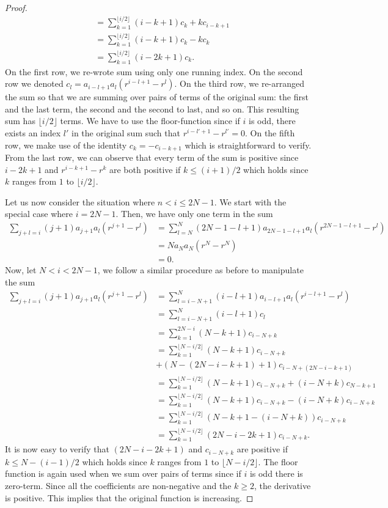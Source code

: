 \begin{proof}
\begin{align*}
&=  \sum_{k =1}^{\lfloor i / 2 \rfloor}(i-k+1)c_k + kc_{i-k+1} \\
&=  \sum_{k =1}^{\lfloor i / 2 \rfloor}(i-k+1)c_k - kc_{k} \\
&= \sum_{k =1}^{\lfloor i / 2 \rfloor}(i-2k+1)c_k.
\end{align*} On the first row, we re-wrote sum using only one running index. On the second row we denoted $c_l =a_{i-l+1}a_l  (r^{i-l+1}- r^l)$. On the third row, we re-arranged the sum so that we are summing over pairs of terms of the original sum: the first and the last term, the second and the second to last, and so on.  This resulting sum has $\lfloor i / 2 \rfloor$ terms. We have to use the floor-function since if $i$ is odd, there exists an index $l'$ in the original sum such that $r^{i-l'+1}-r^{l'} = 0$. On the fifth row, we make use of the identity $c_k = -c_{i-k+1}$ which is straightforward to verify. From the last row, we can observe that every term of the sum is positive since $i-2k+1$ and $r^{i-k+1}- r^k$ are both positive if $k \leq (i+1)/2$ which holds since $k$ ranges from $1$ to $\lfloor i / 2 \rfloor$.

Let us now consider the situation where $n < i \leq 2N-1$. We start with the special case where $i = 2N-1$. Then, we have only one term in the sum
\begin{align*}
\sum_{j+l = i}(j+1)a_{j+1}a_l  (r^{j+1}- r^l) &= \sum_{l=N}^{N}(2N-1-l+1)a_{2N-1-l+1}a_l  (r^{2N-1-l+1}- r^l) \\
&= Na_{N}a_N  (r^{N}- r^N) \\
& = 0.
\end{align*}Now, let $N < i < 2N-1$, we follow a similar procedure as before to manipulate the sum
\begin{align*}
\sum_{j+l = i}(j+1)a_{j+1}a_l  (r^{j+1}- r^l) &= \sum_{l=i-N + 1}^{N}(i-l+1)a_{i-l+1}a_l  (r^{i-l+1}- r^l) \\
& = \sum_{l=i-N + 1}^{N}(i-l+1)c_l \\
& = \sum_{k=1}^{2N-i}(N-k+1)c_{i-N+k} \\
& = \sum_{k=1}^{\lfloor N - i/2 \rfloor}(N-k+1)c_{i-N+k}\\
&+  (N-(2N-i-k+1)+1)c_{i-N+(2N-i-k+1)} \\
&= \sum_{k=1}^{\lfloor N - i/2 \rfloor}(N-k+1)c_{i-N+k} +  (i-N+k)c_{N-k+1} \\
&= \sum_{k=1}^{\lfloor N - i/2 \rfloor}(N-k+1)c_{i-N+k} -  (i-N+k)c_{i-N+k} \\
&= \sum_{k=1}^{\lfloor N - i/2 \rfloor}(N-k+1-(i-N+k))c_{i-N+k} \\
&= \sum_{k=1}^{\lfloor N - i/2 \rfloor}(2N-i-2k+1)c_{i-N+k}.
\end{align*}It is now easy to verify that $(2N-i-2k+1)$ and $c_{i-N+k}$ are positive if $k \leq N - (i-1)/2$ which holds since $k$ ranges from $1$ to $\lfloor N - i/2 \rfloor$. The floor function is again used when we sum over pairs of terms since if $i$ is odd there is zero-term. 
Since all the coefficients are non-negative and the $k \geq 2$, the derivative is positive. This implies that the original function is increasing.
\end{proof}


